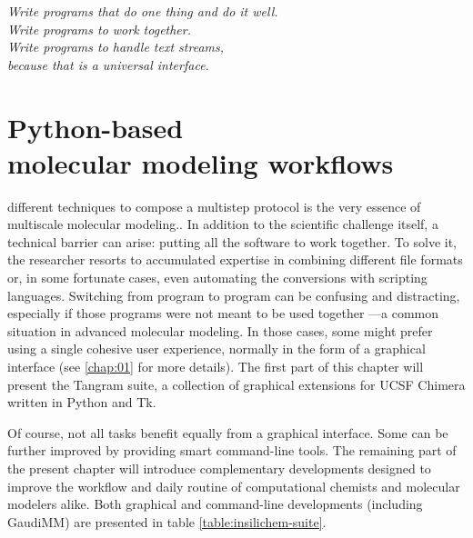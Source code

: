\begin{savequote}[75mm]
	\itshape Write programs that do one thing and do it well. \\
	\itshape Write programs to work together. \\
	\itshape Write programs to handle text streams, \\
	\itshape because that is a universal interface.
\end{savequote}

\chapter[Python-based molecular modeling workflows]{Python-based \\
molecular modeling workflows}
\label{chap:05}

 different techniques to compose a multistep protocol is the very essence of multiscale molecular modeling.. In addition to the scientific challenge itself, a technical barrier can arise: putting all the software to work together. To solve it, the researcher resorts to accumulated expertise in combining different file formats or, in some fortunate cases, even automating the conversions with scripting languages. Switching from program to program can be confusing and distracting, especially if those programs were not meant to be used together ---a common situation in advanced molecular modeling. In those cases, some might prefer using a single cohesive user experience, normally in the form of a graphical interface (see \autoref{chap:01} for more details). The first part of this chapter will present the Tangram suite, a collection of graphical extensions for UCSF Chimera written in Python and Tk.

Of course, not all tasks benefit equally from a graphical interface. Some can be further improved by providing smart command-line tools. The remaining part of the present chapter will introduce complementary developments designed to improve the workflow and daily routine of computational chemists and molecular modelers alike. Both graphical and command-line developments (including GaudiMM) are presented in table \ref{table:insilichem-suite}.


